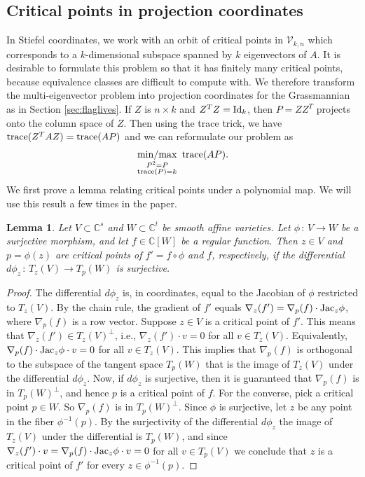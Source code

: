 \documentclass[12pt]{extarticle}
\newtheorem{lemma}[theorem]{Lemma}
\theoremstyle{definition}
\numberwithin{theorem}{section}
\newcommand{\CC}{\mathbb{C}}
\newcommand{\minmax}{\mathop{{\rm min/max}}}
\begin{document}
\subsection{Critical points in projection coordinates}
In Stiefel coordinates, we 
work with an orbit of critical points in $\mathcal V_{k,n}$
which corresponds to a $k$-dimensional subspace spanned by $k$ eigenvectors of $A$. 
It is desirable to formulate this problem so that it has finitely many critical points, because equivalence classes are difficult to compute with. 
We therefore transform the multi-eigenvector problem into projection coordinates for the Grassmannian as in Section \ref{sec:flaglives}. 
If $Z$ is $n \times k$ and $Z^TZ = {\rm Id}_k$, then $P = ZZ^T$ projects onto the column space of $Z$. 
Then using the trace trick, we have ${\rm trace}(Z^T A Z) = {\rm trace}(AP)$ and we can reformulate our problem as
\begin{align}\label{eq:eigen-pgr-problem}
    \minmax_{\substack{P^2 = P \\ {\rm trace}(P) = k}} \,\, {\rm trace}(AP).
\end{align}
We first prove a lemma relating critical points under a polynomial map. We will use this result a few times in the paper. 
\begin{lemma} \label{lem:critical} Let $V \subset \CC^s$ and $W \subset \CC^t$ be smooth affine varieties. Let $\phi \, : \, V \longrightarrow W$ be a surjective morphism, and let $f \in \CC[W]$ be
a regular function. Then $z \in V$ and $p=\phi(z)$
are critical points of $f' = f \circ \phi$ and $f$, respectively, if the differential $d\phi_z \, : \, T_z(V) \longrightarrow T_p(W)$ is surjective. 
\end{lemma}
\begin{proof} The differential $d\phi_z$ is, 
in coordinates, equal to the Jacobian of $\phi$ restricted to $T_z(V)$. By the chain rule, the gradient of $f'$ equals $\nabla_z (f') = \nabla_p(f) \cdot  {\rm Jac}_z \phi$, where $\nabla_p(f)$ is a row vector. Suppose $z \in V$ is a critical point of $f'$. This means that $\nabla_z(f') \in T_z(V)^{\perp}$,  
i.e., $\nabla_z(f') \cdot v = 0$ for all $v \in T_z(V)$.  Equivalently, $\nabla_p(f) \cdot {\rm Jac}_z\phi \cdot v =0$ for all $v \in T_z(V)$.  This implies that $\nabla_p(f)$ is orthogonal to the subspace of the tangent space $T_p(W)$ that is the image of $T_z(V)$ under the differential $d\phi_z$.   Now, if $d\phi_z$ is surjective, then it is guaranteed that  $\nabla_p(f)$ is in  $T_p(W)^{\perp}$, and hence $p$ is a critical point of $f$. For the converse, pick a critical point $p \in W$. So $\nabla_p(f)$ is in $T_p(W)^{\perp}$. 
Since $\phi$ is surjective, let $z$ be any point in the fiber $\phi^{-1}(p)$. By the surjectivity of the differential $d\phi_z$ the image of $T_z(V)$ under the differential is $T_p(W)$, and since  $\nabla_z(f') \cdot v =  \nabla_p(f) \cdot {\rm Jac}_z \phi \cdot v = 0$
for all $v \in T_p(V)$ we conclude that $z$ is a critical point of $f'$ for every $z \in \phi^{-1}(p)$. 
\end{proof}
\end{document}
